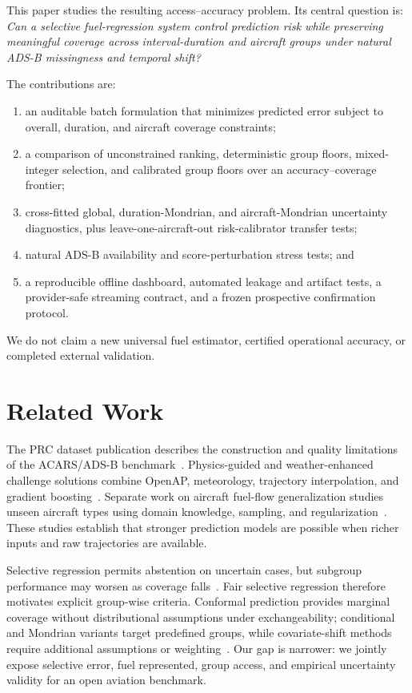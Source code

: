 \documentclass[11pt]{article}
\begin{document}
This paper studies the resulting access--accuracy problem. Its central question is: \emph{Can a selective fuel-regression system control prediction risk while preserving meaningful coverage across interval-duration and aircraft groups under natural ADS-B missingness and temporal shift?}

The contributions are:
\begin{enumerate}[leftmargin=*]
\item an auditable batch formulation that minimizes predicted error subject to overall, duration, and aircraft coverage constraints;
\item a comparison of unconstrained ranking, deterministic group floors, mixed-integer selection, and calibrated group floors over an accuracy--coverage frontier;
\item cross-fitted global, duration-Mondrian, and aircraft-Mondrian uncertainty diagnostics, plus leave-one-aircraft-out risk-calibrator transfer tests;
\item natural ADS-B availability and score-perturbation stress tests; and
\item a reproducible offline dashboard, automated leakage and artifact tests, a provider-safe streaming contract, and a frozen prospective confirmation protocol.
\end{enumerate}

We do not claim a new universal fuel estimator, certified operational accuracy, or completed external validation.

\section{Related Work}
The PRC dataset publication describes the construction and quality limitations of the ACARS/ADS-B benchmark~\cite{sun2026}. Physics-guided and weather-enhanced challenge solutions combine OpenAP, meteorology, trajectory interpolation, and gradient boosting~\cite{grigoriou2026,kacar2026}. Separate work on aircraft fuel-flow generalization studies unseen aircraft types using domain knowledge, sampling, and regularization~\cite{jarry2025}. These studies establish that stronger prediction models are possible when richer inputs and raw trajectories are available.

Selective regression permits abstention on uncertain cases, but subgroup performance may worsen as coverage falls~\cite{shah2022}. Fair selective regression therefore motivates explicit group-wise criteria. Conformal prediction provides marginal coverage without distributional assumptions under exchangeability; conditional and Mondrian variants target predefined groups, while covariate-shift methods require additional assumptions or weighting~\cite{romano2019,gibbs2023}. Our gap is narrower: we jointly expose selective error, fuel represented, group access, and empirical uncertainty validity for an open aviation benchmark.
\end{document}
